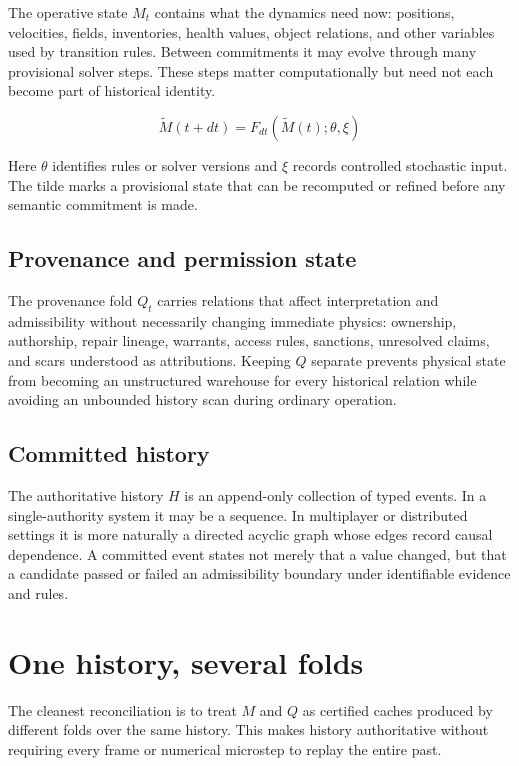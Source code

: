 \documentclass[11pt]{article}
\begin{document}
The operative state $M_t$ contains what the dynamics need now: positions, velocities, fields, inventories, health values, object relations, and other variables used by transition rules. Between commitments it may evolve through many provisional solver steps. These steps matter computationally but need not each become part of historical identity.

\[
\tilde{M}(t+dt) = F_{dt}(\tilde{M}(t); \theta, \xi)
\]

Here $\theta$ identifies rules or solver versions and $\xi$ records controlled stochastic input. The tilde marks a provisional state that can be recomputed or refined before any semantic commitment is made.

\subsection{Provenance and permission state}

The provenance fold $Q_t$ carries relations that affect interpretation and admissibility without necessarily changing immediate physics: ownership, authorship, repair lineage, warrants, access rules, sanctions, unresolved claims, and scars understood as attributions. Keeping $Q$ separate prevents physical state from becoming an unstructured warehouse for every historical relation while avoiding an unbounded history scan during ordinary operation.

\subsection{Committed history}

The authoritative history $H$ is an append-only collection of typed events. In a single-authority system it may be a sequence. In multiplayer or distributed settings it is more naturally a directed acyclic graph whose edges record causal dependence. A committed event states not merely that a value changed, but that a candidate passed or failed an admissibility boundary under identifiable evidence and rules.

\section{One history, several folds}
\label{sec:folds}

The cleanest reconciliation is to treat $M$ and $Q$ as certified caches produced by different folds over the same history. This makes history authoritative without requiring every frame or numerical microstep to replay the entire past.
\end{document}
